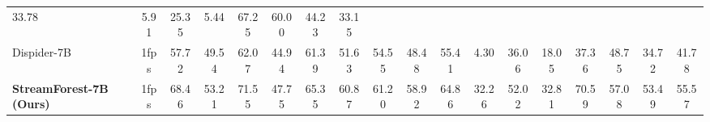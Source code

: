 \begin{table}[ht]
{\begin{tabular}{lccccccccccccccccc}
              33.78 &
              \multicolumn{1}{c|}{5.91} &
              \multicolumn{1}{c|}{25.35} &
              5.44 &
              {67.25} &
              \multicolumn{1}{c|}{{60.00}} &
              \multicolumn{1}{c|}{{44.23}} &
              33.15 \\
            \multicolumn{1}{l|}{Dispider-7B \cite{qian2025dispider}} &
              \multicolumn{1}{c|}{1fps} &
              {57.72} &
              {49.54} &
              {62.07} &
              {44.94} &
              {61.39} &
              \multicolumn{1}{c|}{{51.63}} &
              \multicolumn{1}{c|}{{54.55}} &
              {48.48} &
              {55.41} &
              \multicolumn{1}{c|}{4.30} &
              \multicolumn{1}{c|}{{36.06}} &
              {18.05} &
              37.36 &
              \multicolumn{1}{c|}{48.75} &
              \multicolumn{1}{c|}{34.72} &
              {41.78} \\ \midrule
            \multicolumn{1}{l|}{\textbf{StreamForest-7B (Ours)}} &
              \multicolumn{1}{c|}{1fps} &
              {68.46} &
              {53.21} &
              {71.55} &
              {47.75} &
              {65.35} &
              \multicolumn{1}{c|}{60.87} &
              \multicolumn{1}{c|}{61.20} &
              {58.92} &
              {64.86} &
              \multicolumn{1}{c|}{32.26} &
              \multicolumn{1}{c|}{52.02} &
              {32.81} &
              70.59 &
              \multicolumn{1}{c|}{57.08} &
              \multicolumn{1}{c|}{53.49} &
              {55.57} \\ 
            \midrule\midrule
        \end{tabular}
        }
    \label{app:tab:OVOBench}
\end{table}
